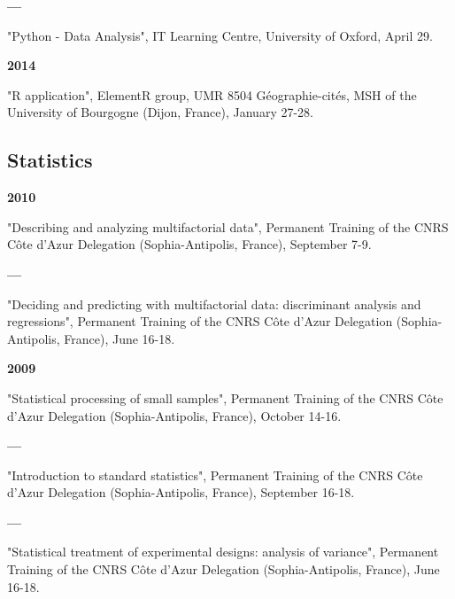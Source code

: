\documentclass{article}
\newcommand{\fr}[1]{}       %
\newcommand{\en}[1]{#1}     %
\begin{document}
\smallbreak
\textbf{--- }
\fr{"\textsf{Python} - Data Analysis", IT Learning Centre, University of Oxford, 29 Avril.}
\en{"\textsf{Python} - Data Analysis", IT Learning Centre, University of Oxford, April 29.}

\smallbreak
\textbf{2014 }
\fr{"\textsf{R} application", groupe \textit{ElementR}, UMR 8504 G\'{e}ographie-cit\'{e}s, MSH de l'Universit\'{e} de Bourgogne (Dijon, France) 27-28 Janvier.}
\en{"\textsf{R} application", ElementR group, UMR 8504 Géographie-cités, MSH of the University of Bourgogne (Dijon, France), January 27-28.}

\smallbreak

\subsection*{\fr{Statistiques}\en{Statistics}}

\textbf{2010 }
\fr{"Décrire et analyser des données multifactorielles", Formation permanente de la Délégation CNRS Côte d'Azur (Sophia-Antipolis, France), 7-9 septembre.}
\en{"Describing and analyzing multifactorial data", Permanent Training of the CNRS Côte d'Azur Delegation (Sophia-Antipolis, France), September 7-9.}

\smallbreak
\textbf{--- }
\fr{"Décider et prédire avec des données multifactorielles : analyse discriminante et régressions", Formation permanente de la Délégation CNRS Côte d'Azur (Sophia-Antipolis, France), 16-18 juin.}
\en{"Deciding and predicting with multifactorial data: discriminant analysis and regressions", Permanent Training of the CNRS Côte d'Azur Delegation (Sophia-Antipolis, France), June 16-18.}

\smallbreak
\textbf{2009 }
\fr{"Traitement statistique des petits échantillons", Formation permanente de la Délégation CNRS Côte d'Azur (Sophia-Antipolis, France), 14-16 octobre.}
\en{"Statistical processing of small samples", Permanent Training of the CNRS Côte d'Azur Delegation (Sophia-Antipolis, France), October 14-16.}

\smallbreak
\textbf{--- }
\fr{"Introduction aux statistiques standards", Formation permanente de la Délégation CNRS Côte d'Azur (Sophia-Antipolis, France), 16-18 septembre.}
\en{"Introduction to standard statistics", Permanent Training of the CNRS Côte d'Azur Delegation (Sophia-Antipolis, France), September 16-18.}

\smallbreak
\textbf{--- }
\fr{"Traitement statistique des plans d'expériences : analyse de la variance", Formation permanente de la Délégation CNRS Côte d'Azur (Sophia-Antipolis, France), 16-18 juin.}
\en{"Statistical treatment of experimental designs: analysis of variance", Permanent Training of the CNRS Côte d'Azur Delegation (Sophia-Antipolis, France), June 16-18.}
\end{document}
